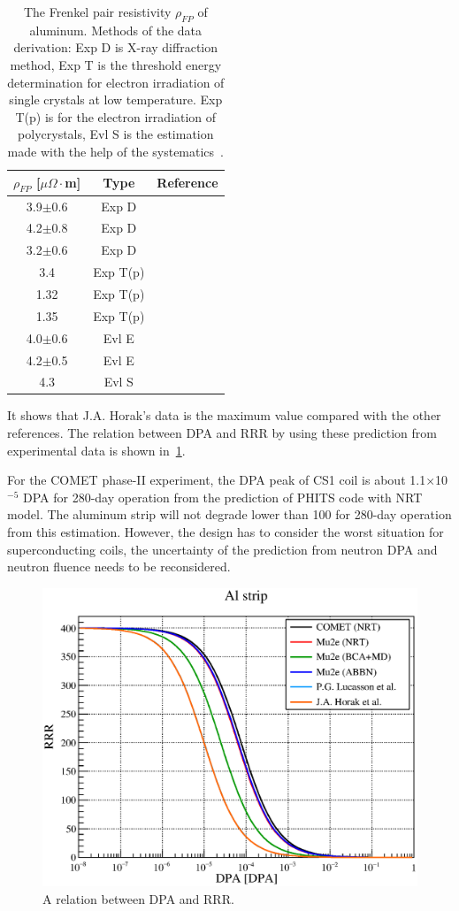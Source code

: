 \begin{table}[H]
 \centering
 \begin{tabular}{ccc} \hline \hline
  $\rho_{FP}$ [$\mu\Omega\cdot$m] & Type & Reference \\ \hline
  3.9$\pm$0.6 & Exp D & \cite{erh1} \\
  4.2$\pm$0.8 & Exp D & \cite{erh2} \\
  3.2$\pm$0.6 & Exp D & \cite{rober} \\
  3.4 & Exp T(p) & \cite{ref1} \\
  1.32 & Exp T(p) & \cite{ref2} \\
  1.35 & Exp T(p) & \cite{ref3} \\
  4.0$\pm$0.6 & Evl E & \cite{ref4} \\
  4.2$\pm$0.5 & Evl E & \cite{ref5} \\
  4.3 & Evl S & \cite{ref6} \\ \hline \hline
 \end{tabular}
 \caption{The Frenkel pair resistivity $\rho_{FP}$ of aluminum. Methods of the data derivation: Exp D is X-ray diffraction method, Exp T is the threshold energy determination for electron irradiation of single crystals at low temperature. Exp T(p) is for the electron irradiation of polycrystals, Evl S is the estimation made with the help of the systematics~\cite{yu}.}
 \label{frank}
\end{table}
It shows that J.A. Horak's data is the maximum value compared with the other references.
The relation between DPA and RRR by using these prediction from experimental data is shown in~\ref{dpaaa}.

For the COMET phase-II experiment, the DPA peak of CS1 coil is about 1.1$\times$10$^{-5}$ DPA for 280-day operation from the prediction of PHITS code with NRT model.
The aluminum strip will not degrade lower than 100 for 280-day operation from this estimation.
However, the design has to consider the worst situation for superconducting coils, the uncertainty of the prediction from neutron DPA and neutron fluence needs to be reconsidered.
\begin{figure}[H]
 \centering
 \includegraphics[scale=0.5]{chapter4/fig/dpadegradation.eps}
 \caption{ A relation between DPA and RRR.}
 \label{dpaaa}
\end{figure}
